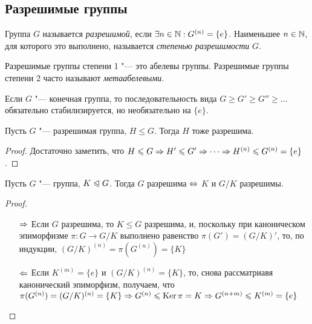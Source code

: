 \subsection{Разрешимые группы}

\begin{definition}
	Группа $G$ называется \textit{разрешимой}, если $\exists n \hm\in \N: G^{(n)} = \{e\}$. Наименьшее $n \in \mathbb{N}$, для которого это выполнено, называется \textit{степенью разрешимости} $G$.
\end{definition}

\begin{note}
	Разрешимые группы степени 1 "--- это абелевы группы. Разрешимые группы степени 2 часто называют \textit{метаабелевыми}.
\end{note}

\begin{note}
	Если $G$ "--- конечная группа, то последовательность вида $G \ge G' \ge G'' \ge \dotsc$ обязательно стабилизируется, но необязательно на $\{e\}$.
\end{note}

\begin{proposition}
	Пусть $G$ "--- разрешимая группа, $H \le G$. Тогда $H$ тоже разрешима.
\end{proposition}

\begin{proof}
	Достаточно заметить, что $H \le G \ra H' \le G' \hm\ra \dotsb \ra H^{(n)} \le G^{(n)} \hm= \{e\}$.
\end{proof}

\begin{theorem}
	Пусть $G$ "--- группа, $K \trianglelefteqslant G$. Тогда $G$ разрешима $\Leftrightarrow$ $K$ и $G / K$ разрешимы.
\end{theorem}

\begin{proof}~
	\begin{itemize}
		\item[$\Rightarrow$] Если $G$ разрешима, то $K \le G$ разрешима, и, поскольку при каноническом эпиморфизме $\pi: G \to G/K$ выполнено равенство $\pi(G') = (G / K)'$, то, по индукции, $(G / K)^{(n)} = \pi(G^{(n)}) = \{K\}$
		\item[$\Leftarrow$] Если $K^{(m)} = \{e\}$ и $(G / K)^{(n)} = \{K\}$, то, снова рассматриавя канонический эпиморфизм, получаем, что $\pi(G^{(n)}) = (G / K)^{(n)} \hm= \{K\} \ra G^{(n)} \le \ke\pi = K \ra G^{(n + m)} \le K^{(m)} \hm= \{e\}$
	\end{itemize}
\end{proof}


